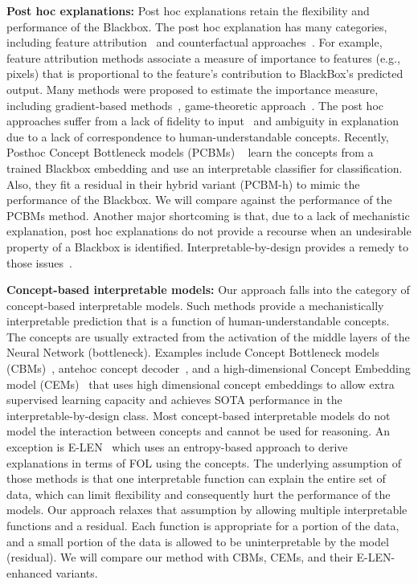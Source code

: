 
\textbf{Post hoc explanations:} 
Post hoc explanations retain the flexibility and performance of the Blackbox. The post hoc explanation has many categories, including feature attribution~\cite{simonyan2013deep, smilkov2017smoothgrad, binder2016layer} and counterfactual approaches~\cite{singla2019explanation, abid2021meaningfully}. For example, feature attribution methods associate a measure of importance to features (e.g., pixels) that is proportional to the feature's contribution to BlackBox's predicted output. Many methods were proposed to estimate the importance measure, including gradient-based methods~\cite{selvaraju2017grad, sundararajan2017axiomatic}, game-theoretic approach~\cite{SHAP}. The post hoc approaches suffer from a lack of fidelity to input~\cite{adebayo2018sanity} and ambiguity in explanation due to a lack of correspondence to human-understandable concepts. Recently, Posthoc Concept Bottleneck models (PCBMs) ~\cite{yuksekgonul2022post} learn the concepts from a trained Blackbox embedding and use an interpretable classifier for classification. Also, they fit a residual in their hybrid variant (PCBM-h) to mimic the performance of the Blackbox. We will compare against the performance of the PCBMs method. Another major shortcoming is that, due to a lack of mechanistic explanation, post hoc explanations do not provide a recourse when an undesirable property of a Blackbox is identified. Interpretable-by-design provides a remedy to those issues~\cite{rudin2019stop}.




\textbf{Concept-based interpretable models:}
Our approach falls into the category of concept-based interpretable models. 
Such methods provide a mechanistically interpretable prediction that is a function of human-understandable concepts. The concepts are usually extracted from the activation of the middle layers of the Neural Network (bottleneck). Examples include Concept Bottleneck models (CBMs)~\cite{koh2020concept},  antehoc concept decoder~\cite{sarkar2021inducing}, and a high-dimensional Concept Embedding model (CEMs)~\cite{zarlenga2022concept} that uses high dimensional concept embeddings to allow extra supervised learning capacity and achieves SOTA performance in the interpretable-by-design class. Most concept-based interpretable models do not model the interaction between concepts and cannot be used for reasoning. An exception is E-LEN~\cite{barbiero2022entropy} which uses an entropy-based approach to derive explanations in terms of FOL using the concepts. The underlying assumption of those methods is that one interpretable function can explain the entire set of data, which can limit flexibility and consequently hurt the performance of the models. Our approach relaxes that assumption by allowing multiple interpretable functions and a residual. Each function is appropriate for a portion of the data, and a small portion of the data is allowed to be uninterpretable by the model (\ie residual). We will compare our method with CBMs, CEMs, and their E-LEN-enhanced variants. 
 



